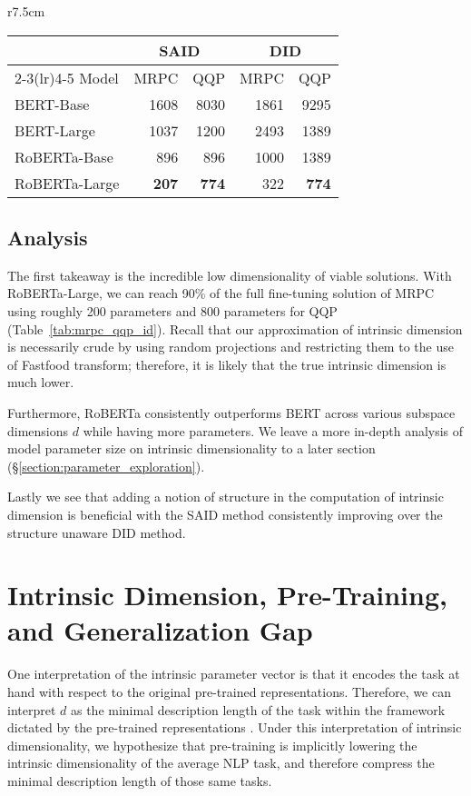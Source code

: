 \documentclass{article} \usepackage{iclr2020_conference,times}
\begin{document}
\begin{wraptable}{r}{7.5cm}
\vspace{-2em}
\centering
\small
\begin{tabular}{lrrrr}\\\toprule 
    & \multicolumn{2}{c}{SAID}  & \multicolumn{2}{c}{DID} \\ \cmidrule(lr){2-3}\cmidrule(lr){4-5} 
Model & MRPC & QQP & MRPC & QQP \\\midrule
BERT-Base & 1608 & 8030 & 1861 & 9295 \\  
BERT-Large & 1037 & 1200& 2493 & 1389\\  \midrule
RoBERTa-Base & 896 & 896& 1000 & 1389 \\  
RoBERTa-Large & \bf{207} & \bf{774}& 322 & \bf{774}\\  \bottomrule
\end{tabular}
\caption{Estimated $d_{90}$ intrinsic dimension for a set of sentence prediction tasks and common pre-trained models. We present both the \textit{SAID} and \textit{DID} methods.}
\label{tab:mrpc_qqp_id}
\end{wraptable} 

\subsection{Analysis}
The first takeaway is the incredible low dimensionality of viable solutions. With RoBERTa-Large, we can reach 90\% of the full fine-tuning solution of MRPC using roughly 200 parameters and 800 parameters for QQP (Table~\ref{tab:mrpc_qqp_id}). Recall that our approximation of intrinsic dimension is necessarily crude by using random projections and restricting them to the use of Fastfood transform; therefore, it is likely that the true intrinsic dimension is much lower.

Furthermore, RoBERTa consistently outperforms BERT across various subspace dimensions $d$ while having more parameters. We leave a more in-depth analysis of model parameter size on intrinsic dimensionality to a later section (\S\ref{section:parameter_exploration}).

Lastly we see that adding a notion of structure in the computation of intrinsic dimension is beneficial with the SAID method consistently improving over the structure unaware DID method.

\section{Intrinsic Dimension, Pre-Training, and Generalization Gap}
One interpretation of the intrinsic parameter vector is that it encodes the task at hand with respect to the original pre-trained representations. Therefore, we can interpret $d$ as the minimal description length of the task within the framework dictated by the pre-trained representations \citep{min_desc_length}. Under this interpretation of intrinsic dimensionality, we hypothesize that pre-training is implicitly lowering the intrinsic dimensionality of the average NLP task, and therefore compress the minimal description length of those same tasks.
\end{document}

